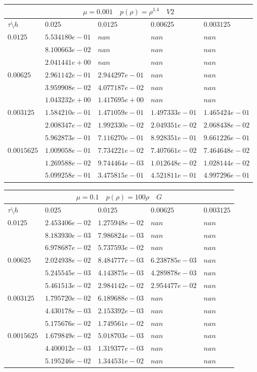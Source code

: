 \documentclass[a4paper,12pt]{extarticle}
\begin{document}
\begin{tabular}{|l|l|l|l|l|}
	\hline
	\multicolumn{5}{|c|}{$\mu =0.001 \quad  p(\rho) = \rho^{1.4} \quad V2$}\\
	\hline
	$\tau\setminus h$ & $0.025$ & $0.0125$ & $0.00625$ & $0.003125$\\
	\hline
	$0.0125$  & $5.534180e-01$ & $nan$ & $nan$ & $nan$\\
	& $8.100663e-02$ & $nan$ & $nan$ & $nan$\\
	& $2.041441e+00$ & $nan$ & $nan$ & $nan$\\
	\hline
	$0.00625$  & $2.961142e-01$ & $2.944297e-01$ & $nan$ & $nan$\\
	& $3.959908e-02$ & $4.077187e-02$ & $nan$ & $nan$\\
	& $1.043232e+00$ & $1.417695e+00$ & $nan$ & $nan$\\
	\hline
	$0.003125$  & $1.584210e-01$ & $1.471059e-01$ & $1.497333e-01$ & $1.465424e-01$\\
	& $2.008347e-02$ & $1.992330e-02$ & $2.049351e-02$ & $2.068438e-02$\\
	& $5.962873e-01$ & $7.116270e-01$ & $8.928351e-01$ & $9.661226e-01$\\
	\hline
	$0.0015625$  & $1.009058e-01$ & $7.734221e-02$ & $7.407661e-02$ & $7.464648e-02$\\
	& $1.269588e-02$ & $9.744464e-03$ & $1.012648e-02$ & $1.028144e-02$\\
	& $5.099258e-01$ & $3.475815e-01$ & $4.521811e-01$ & $4.997296e-01$\\
	\hline
\end{tabular}

\begin{tabular}{|l|l|l|l|l|}
	\hline
	\multicolumn{5}{|c|}{$\mu =0.1 \quad  p(\rho) =100 \rho \quad G$}\\
	\hline
	$\tau\setminus h$ & $0.025$ & $0.0125$ & $0.00625$ & $0.003125$\\
	\hline
	$0.0125$  & $2.453406e-02$ & $1.275948e-02$ & $nan$ & $nan$\\
	& $8.183930e-03$ & $7.986824e-03$ & $nan$ & $nan$\\
	& $6.978687e-02$ & $5.737593e-02$ & $nan$ & $nan$\\
	\hline
	$0.00625$  & $2.024938e-02$ & $8.484777e-03$ & $6.238785e-03$ & $nan$\\
	& $5.245545e-03$ & $4.143875e-03$ & $4.289878e-03$ & $nan$\\
	& $5.461513e-02$ & $2.984142e-02$ & $2.954477e-02$ & $nan$\\
	\hline
	$0.003125$  & $1.795720e-02$ & $6.189688e-03$ & $nan$ & $nan$\\
	& $4.430178e-03$ & $2.153392e-03$ & $nan$ & $nan$\\
	& $5.175676e-02$ & $1.749561e-02$ & $nan$ & $nan$\\
	\hline
	$0.0015625$  & $1.679849e-02$ & $5.018703e-03$ & $nan$ & $nan$\\
	& $4.400012e-03$ & $1.319377e-03$ & $nan$ & $nan$\\
	& $5.195246e-02$ & $1.344531e-02$ & $nan$ & $nan$\\
	\hline
\end{tabular}
\end{document}
